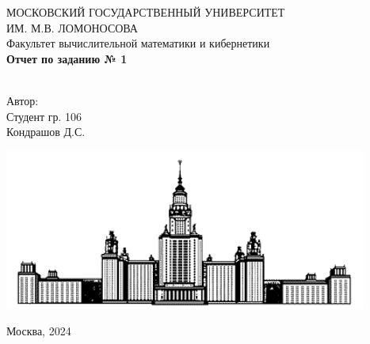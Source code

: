 \begin{titlepage}
	\begin{center}
		МОСКОВСКИЙ ГОСУДАРСТВЕННЫЙ УНИВЕРСИТЕТ \\
		ИМ. М.В. ЛОМОНОСОВА \\
		
		
		\hfill \break
		Факультет вычислительной математики и кибернетики\\
		\vspace{2.5cm}
		\large{\textbf{Отчет по заданию № 1}}\\
		\hfill \break
		\\
	\end{center}
	
	\begin{flushright}
		Автор:\\
		Студент гр. 106\\
		Кондрашов Д.С.
	\end{flushright}
	
	\vspace{7cm}
	
	\begin{center}
		\includegraphics[width=0.3\linewidth]{msu_logo}
	\end{center}
	
	
	
	
	\vfill
	
	\begin{center} Москва, 2024 \end{center}
	
	\thispagestyle{empty}
	
\end{titlepage}